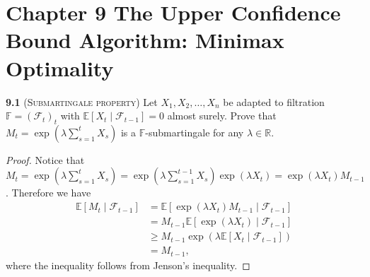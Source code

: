 \chapter*{Chapter 9 The Upper Confidence Bound Algorithm: Minimax Optimality}
\label{sec:ninth}

\noindent\textbf{9.1} (\textsc{Submartingale property}) Let $X_{1}, X_{2}, \ldots, X_{n}$ be adapted to filtration $\mathbb{F}=\left(\mathcal{F}_{t}\right)_{t}$ with $\mathbb{E}\left[X_{t} \mid \mathcal{F}_{t-1}\right]=0$ almost surely.
Prove that $M_{t}=\exp \left(\lambda \sum_{s=1}^{t} X_{s}\right)$ is a $\mathbb{F}$-submartingale for any $\lambda \in \mathbb{R}$.

\begin{proof}
    Notice that $M_t = \exp(\lambda \sum_{s=1}^t X_s) = \exp(\lambda \sum_{s=1}^{t-1} X_s)\exp(\lambda X_t) = \exp(\lambda X_t) M_{t-1}$.
    Therefore we have
    \begin{equation*}
        \begin{aligned}
            \mathbb{E}\left[M_{t} \mid \mathcal{F}_{t-1}\right]
            &= \mathbb{E}\left[\exp(\lambda X_t) M_{t-1} \mid \mathcal{F}_{t-1}\right]\\
            &= M_{t-1} \mathbb{E}\left[\exp(\lambda X_t) \mid \mathcal{F}_{t-1}\right]\\
            &\geq M_{t-1} \exp(\lambda \mathbb{E}\left[X_{t} \mid \mathcal{F}_{t-1}\right])\\
            &= M_{t-1},
        \end{aligned}
    \end{equation*}
    where the inequality follows from Jenson's inequality.
\end{proof}

